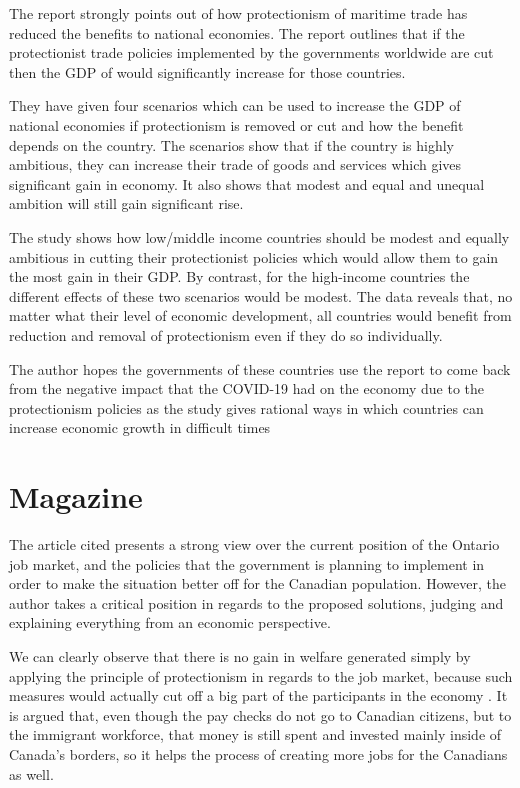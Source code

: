 \documentclass [11pt]{article}
\begin{document}
The report strongly points out of how protectionism of maritime trade has reduced the benefits to national economies. The report outlines that if the protectionist trade policies implemented by the governments worldwide are cut then the GDP of would significantly increase for those countries.  
\parencite{CraigVang2021PiMES}

They have given four scenarios which can be used to increase the GDP of national economies if protectionism is removed or cut and how the benefit depends on the country. The scenarios show that if the country is highly ambitious, they can increase their trade of goods and services which gives significant gain in economy. It also shows that modest and equal and unequal ambition will still gain significant rise. 

The study shows how low/middle income countries should be modest and equally ambitious in cutting their protectionist policies which would allow them to gain the most gain in their GDP. By contrast, for the high-income countries the different effects of these two scenarios would be modest. The data reveals that, no matter what their level of economic development, all countries would benefit from reduction and removal of protectionism even if they do so individually. 

The author hopes the governments of these countries use the report to come back from the negative impact that the COVID-19 had on the economy due to the protectionism policies as the study gives rational ways in which countries can increase economic growth in difficult times 

\section{Magazine}

The article cited presents a strong view over the current position of the Ontario job market, and the policies that the government is planning to implement in order to make the situation better off for the Canadian population. However, the author takes a critical position in regards to the proposed solutions, judging and explaining everything from an economic perspective. 

We can clearly observe that there is no gain in welfare generated simply by applying the principle of protectionism in regards to the job market, because such measures would actually cut off a big part of the participants in the economy \parencite{MatthewLau2020Adep}. It is argued that, even though the pay checks do not go to Canadian citizens, but to the immigrant workforce, that money is still spent and invested mainly inside of Canada’s borders, so it helps the process of creating more jobs for the Canadians as well. 
\end{document}
